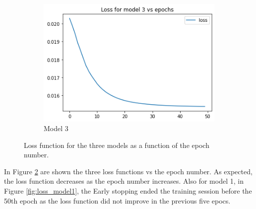 \documentclass[12pt]{extarticle}
\begin{document}
\begin{figure}[h!]
\begin{subfigure}[b]{0.45\textwidth}
         \includegraphics[width=\textwidth]{loss_model3.png}
         \caption{Model 3}
         \label{fig:loss_model3}
     \end{subfigure}
        \caption{Loss function for the three models as a function of the epoch number.}
        \label{fig:loss_models}
\end{figure}

\noindent In Figure \ref{fig:loss_models} are shown the three loss functions vs the epoch number. As expected, the loss function decreases as the epoch number increases. Also for model 1, in Figure \ref{fig:loss_model1}, the Early stopping ended the training session before the 50th epoch as the loss function did not improve in the previous five epocs.
\end{document}
